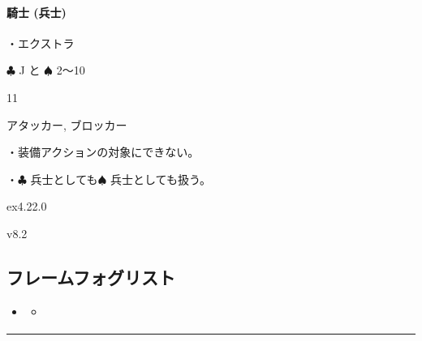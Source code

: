 \documentclass[letterpaper,10pt,dvipdfmx]{sphinxmanual}
\begin{document}
\paragraph{騎士 (兵士)}
\label{\detokenize{auto/frameActionlist:char-knight}}\label{\detokenize{auto/frameActionlist:id102}}
\sphinxAtStartPar
{}

\sphinxAtStartPar
・エクストラ

\sphinxAtStartPar
{} {\normalsize $\clubsuit$} J と {\normalsize $\spadesuit$} 2〜10

\sphinxAtStartPar
{} 11

\sphinxAtStartPar
{} アタッカー, ブロッカー

\sphinxAtStartPar
{}

\sphinxAtStartPar
・装備アクションの対象にできない。

\sphinxAtStartPar
・{\normalsize $\clubsuit$} 兵士としても{\normalsize $\spadesuit$} 兵士としても扱う。

\sphinxAtStartPar
{}  ex4.22.0

\sphinxAtStartPar
{}  v8.2


\subsection{フレームフォグリスト}
\label{\detokenize{auto/frameActionlist:foglist-act-frame}}\label{\detokenize{auto/frameActionlist:id103}}
\begin{sphinxShadowBox}
\begin{itemize}
\item {} 
\sphinxAtStartPar
{}\label{\detokenize{auto/frameActionlist:id272}}{\hyperref[\detokenize{auto/frameActionlist:id105}]{}}
\begin{itemize}
\item {} 
\sphinxAtStartPar
{}\label{\detokenize{auto/frameActionlist:id273}}{\hyperref[\detokenize{auto/frameActionlist:fog-closefog}]{}}

\end{itemize}

\end{itemize}
\end{sphinxShadowBox}


\bigskip\hrule\bigskip
\end{document}
